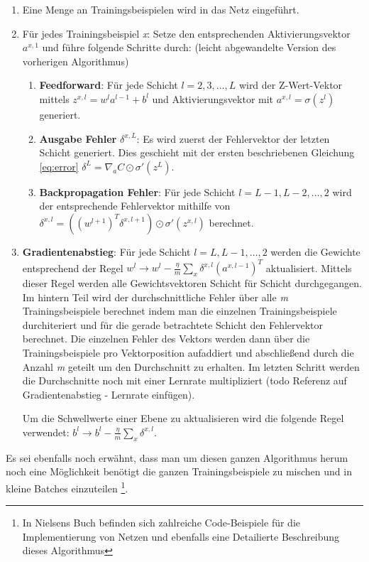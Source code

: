 \begin{enumerate}

\item Eine Menge an Trainingsbeispielen wird in das Netz eingeführt.

\item Für jedes Trainingsbeispiel \emph{x}: Setze den entsprechenden Aktivierungsvektor $a^{x,1}$ und führe folgende Schritte durch: (leicht abgewandelte Version des vorherigen Algorithmus)
\begin{enumerate}

	\item \textbf{Feedforward}: Für jede Schicht $l = 2, 3, \ldots, L$ wird der Z-Wert-Vektor mittels $z^{x,l} = w^l a^{l-1}+b^l$ und Aktivierungsvektor mit $a^{x,l} = \sigma(z^{l})$ generiert.
	
	\item \textbf{Ausgabe Fehler} $\delta^{x,L}$: Es wird zuerst der Fehlervektor der letzten Schicht generiert. Dies geschieht mit der ersten beschriebenen Gleichung \ref{eq:error} $\delta^{L}  = \nabla_a C \odot \sigma'(z^L)$. 
	
	\item \textbf{Backpropagation Fehler}: Für jede Schicht $l = L-1, L-2, \ldots, 2$ wird der entsprechende Fehlervektor mithilfe von $\delta^{x,l} = ((w^{l+1})^T \delta^{x,l+1}) \odot \sigma'(z^{x,l})$ berechnet. 
\end{enumerate}

\item \textbf{Gradientenabstieg}: Für jede Schicht $l = L, L-1, \ldots, 2$ werden die Gewichte entsprechend der Regel $w^l \rightarrow w^l-\frac{\eta}{m} \sum_x \delta^{x,l} (a^{x,l-1})^T$ aktualisiert. Mittels dieser Regel werden alle Gewichtsvektoren Schicht für Schicht durchgegangen. Im hintern Teil wird der durchschnittliche Fehler über alle \emph{m} Trainingsbeispiele berechnet indem man die einzelnen Trainingsbeispiele durchiteriert und für die gerade betrachtete Schicht den Fehlervektor berechnet. Die einzelnen Fehler des Vektors werden dann über die Trainingsbeispiele pro Vektorposition aufaddiert und abschließend durch die Anzahl \emph{m} geteilt um den Durchschnitt zu erhalten. Im letzten Schritt werden die Durchschnitte noch mit einer Lernrate multipliziert (todo Referenz auf Gradientenabstieg - Lernrate einfügen). 

Um die Schwellwerte einer Ebene zu aktualisieren wird die folgende Regel verwendet: $b^l \rightarrow b^l-\frac{\eta}{m} \sum_x \delta^{x,l}$.

\end{enumerate} 


Es sei ebenfalls noch erwähnt, dass man um diesen ganzen Algorithmus herum noch eine Möglichkeit benötigt die ganzen Trainingsbeispiele zu mischen und in kleine Batches einzuteilen \footnote{In Nielsens Buch \cite{dlnielsen} befinden sich zahlreiche Code-Beispiele für die Implementierung von Netzen und ebenfalls eine Detailierte Beschreibung dieses Algorithmus}. 
